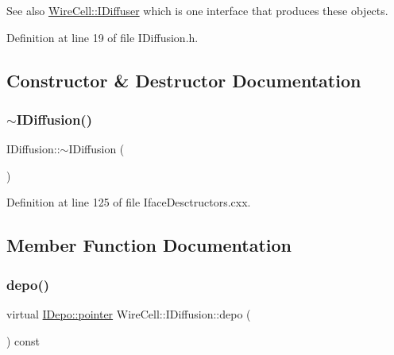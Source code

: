 See also \hyperlink{class_wire_cell_1_1_i_diffuser}{Wire\+Cell\+::\+I\+Diffuser} which is one interface that produces these objects. 

Definition at line 19 of file I\+Diffusion.\+h.



\subsection{Constructor \& Destructor Documentation}
\mbox{\label{class_wire_cell_1_1_i_diffusion_a3a3fe50025a9f034cb5552a054c4c7b7}} 
\subsubsection{\texorpdfstring{$\sim$\+I\+Diffusion()}{~IDiffusion()}}
{\footnotesize\ttfamily I\+Diffusion\+::$\sim$\+I\+Diffusion (\begin{DoxyParamCaption}{ }\end{DoxyParamCaption})\hspace{0.3cm}{\ttfamily [virtual]}}



Definition at line 125 of file Iface\+Desctructors.\+cxx.



\subsection{Member Function Documentation}
\mbox{\label{class_wire_cell_1_1_i_diffusion_a657118deda45efadd86ec286ee9242a7}} 
\subsubsection{\texorpdfstring{depo()}{depo()}}
{\footnotesize\ttfamily virtual \hyperlink{class_wire_cell_1_1_i_data_aff870b3ae8333cf9265941eef62498bc}{I\+Depo\+::pointer} Wire\+Cell\+::\+I\+Diffusion\+::depo (\begin{DoxyParamCaption}{ }\end{DoxyParamCaption}) const\hspace{0.3cm}{\ttfamily [pure virtual]}}



